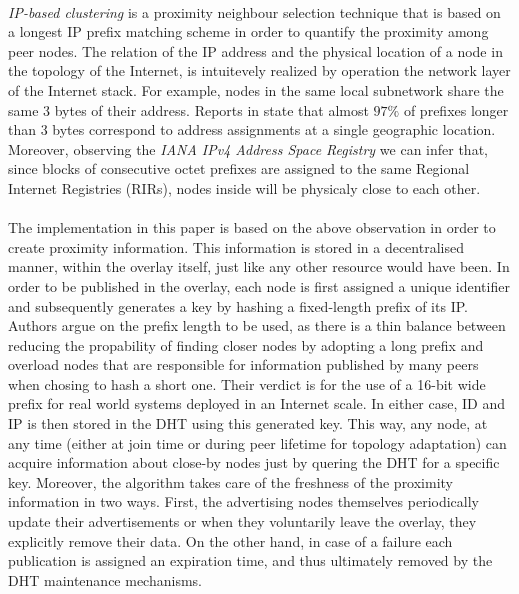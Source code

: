 \documentclass[a4paper,10pt]{article}
\begin{document}
\paragraph{}
\emph{IP-based clustering} \cite{karwaczynski_ipbc_2007} is a proximity neighbour selection technique that is based on a longest IP prefix matching scheme in order to quantify the proximity among peer nodes. The relation of the IP address and the physical location of a node in the topology of the Internet, is intuitevely realized by operation the network layer of the Internet stack. For example, nodes in the same local subnetwork share the same 3 bytes of their address. Reports in \cite{freedman_iploc_2005} state that almost $97\%$ of prefixes longer than 3 bytes correspond to address assignments at a single geographic location. Moreover, observing the \emph{IANA IPv4 Address Space Registry} we can infer that, since blocks of consecutive octet prefixes are assigned to the same Regional Internet Registries (RIRs), nodes inside will be physicaly close to each other.

\paragraph{}
The implementation in this paper is based on the above observation in order to create proximity information. This information is stored in a decentralised manner, within the overlay itself, just like any other resource would have been. In order to be published in the overlay, each node is first assigned a unique identifier and subsequently generates a key by hashing a fixed-length prefix of its IP. Authors argue on the prefix length to be used, as there is a thin balance between reducing the propability of finding closer nodes by adopting a long prefix and overload nodes that are responsible for information published by many peers when chosing to hash a short one. Their verdict is for the use of a 16-bit wide prefix for real world systems deployed in an Internet scale. In either case, ID and IP is then stored in the DHT using this generated key. This way, any node, at any time (either at join time or during peer lifetime for topology adaptation) can acquire information about close-by nodes just by quering the DHT for a specific key. Moreover, the algorithm takes care of the freshness of the proximity information in two ways. First, the advertising nodes themselves periodically update their advertisements or when they voluntarily leave the overlay, they explicitly remove their data. On the other hand, in case of a failure each publication is assigned an expiration time, and thus ultimately removed by the DHT maintenance mechanisms.
\end{document}
